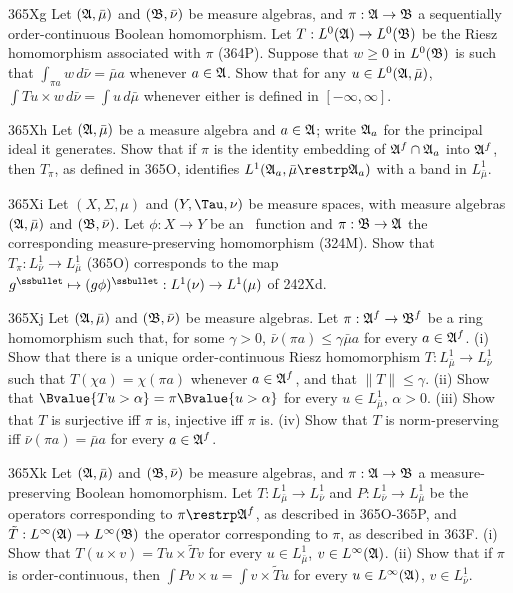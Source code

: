 {\spheader 365Xg Let $(\frak A,\bar\mu)$ and $(\frak B,\bar\nu)$ be
measure algebras, and $\pi:\frak A\to\frak B$ a sequentially
order-continuous Boolean homomorphism.   Let
$T:L^0(\frak A)\to L^0(\frak B)$ be the Riesz homomorphism associated
with $\pi$ (364P).
Suppose that $w\ge 0$ in $L^0(\frak B)$ is such that
$\int_{\pi a}w\,d\bar\nu=\bar\mu a$ whenever $a\in\frak A$.   Show that
for any $u\in L^0(\frak A,\bar\mu)$,
$\int Tu\times w\,d\bar\nu=\int u\,d\bar\mu$ whenever either is defined
in $[-\infty,\infty]$.
     
\sqheader 365Xh Let $(\frak A,\bar\mu)$ be a measure algebra and
$a\in\frak A$;  write $\frak A_a$ for the principal ideal it generates.
Show that if $\pi$ is the identity embedding of $\frak A^f\cap\frak A_a$
into $\frak A^f$, then $T_{\pi}$, as defined in 365O, identifies
$L^1(\frak A_a,\bar\mu\restrp\frak A_a)$ with a band in
$L^1_{\bar\mu}$.
     
\sqheader 365Xi Let $(X,\Sigma,\mu)$ and $(Y,\Tau,\nu)$ be measure
spaces, with measure algebras $(\frak A,\bar\mu)$ and
$(\frak B,\bar\nu)$.   Let $\phi:X\to Y$ be an \imp\ function and
$\pi:\frak B\to\frak A$ the corresponding
measure-preserving homomorphism (324M).   Show that
$T_{\pi}:L^1_{\bar\nu}\to L^1_{\bar\mu}$ (365O) corresponds to the map
$g^{\ssbullet}\mapsto(g\phi)^{\ssbullet}:L^1(\nu)\to L^1(\mu)$ of
242Xd.
     
\spheader 365Xj Let $(\frak A,\bar\mu)$ and $(\frak B,\bar\nu)$
be measure algebras.   Let $\pi:\frak A^f\to\frak B^f$ be a
ring homomorphism such that, for some $\gamma>0$, $\bar\nu(\pi
a)\le\gamma\bar\mu a$ for every $a\in\frak A^f$.  (i) Show that there is
a unique order-continuous Riesz
homomorphism $T:L^1_{\bar\mu}\to L^1_{\bar\nu}$ such that
$T(\chi a)=\chi(\pi a)$ whenever $a\in\frak A^f$, and that
$\|T\|\le\gamma$.   (ii) Show that
$\Bvalue{Tu>\alpha}=\pi\Bvalue{u>\alpha}$ for every
$u\in L^1_{\bar\mu}$, $\alpha>0$.
(iii) Show that $T$ is surjective iff $\pi$ is, injective iff $\pi$ is.
(iv) Show that $T$ is norm-preserving iff $\bar\nu(\pi a)=\bar\mu a$ for
every $a\in\frak A^f$.
     
\spheader 365Xk Let $(\frak A,\bar\mu)$ and $(\frak B,\bar\nu)$ be
measure algebras, and $\pi:\frak A\to\frak B$ a measure-preserving
Boolean homomorphism.   Let $T:L^1_{\bar\mu}\to L^1_{\bar\nu}$ and
$P:L^1_{\bar\nu}\to L^1_{\bar\mu}$ be the operators corresponding to
$\pi\restrp\frak A^f$, as described in 365O-365P, and
$\tilde T:L^{\infty}(\frak A)\to L^{\infty}(\frak B)$ the operator
corresponding to $\pi$, as described in 363F.   (i) Show that
$T(u\times v)=Tu\times \tilde Tv$ for every $u\in L^1_{\bar\mu}$,
$v\in L^{\infty}(\frak A)$.
(ii) Show that if $\pi$ is order-continuous, then $\int Pv\times u=\int
v\times\tilde Tu$ for every $u\in L^{\infty}(\frak A)$, $v\in
L^1_{\bar\nu}$.
     
}
